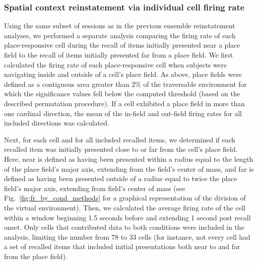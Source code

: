 \subsubsection*{Spatial context reinstatement via individual cell firing rate}
Using the same subset of sessions as in the previous ensemble reinstatement analyses, we performed a separate analysis comparing the firing rate of each place-responsive cell during the recall of items initially presented near a place field to the recall of items initially presented far from a place field.  We first calculated the firing rate of each place-responsive cell when subjects were navigating inside and outside of a cell's place field. As above, place fields were defined as a contiguous area greater than 2\% of the traversable environment for which the significance values fell below the computed threshold (based on the described permutation procedure).  If a cell exhibited a place field in more than one cardinal direction, the mean of the in-field and out-field firing rates for all included directions was calculated.

Next, for each cell and for all included recalled items, we determined if each recalled item was initially presented close to or far from the cell's place field. Here, near is defined as having been presented within a radius equal to the length of the place field's major axis, extending from the field's center of mass, and far is defined as having been presented outside of a radius equal to twice the place field's major axis, extending from field's center of mass (see Fig.~\ref{fig:fr_by_cond_methods} for a graphical representation of the division of the virtual environment). Then, we calculated the average firing rate of the cell within a window beginning 1.5 seconds before and extending 1 second post recall onset. Only cells that contributed data to both conditions were included in the analysis, limiting the number from 78 to 33 cells (for instance, not every cell had a set of recalled items that included initial presentations both near to and far from the place field).

